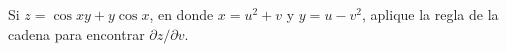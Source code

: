 \item Si $z = \cos xy + y \cos x$, en donde $x = u^2 + v$ y $y = u - v^2$, aplique la regla de la cadena para encontrar $\partial z / \partial v$.
